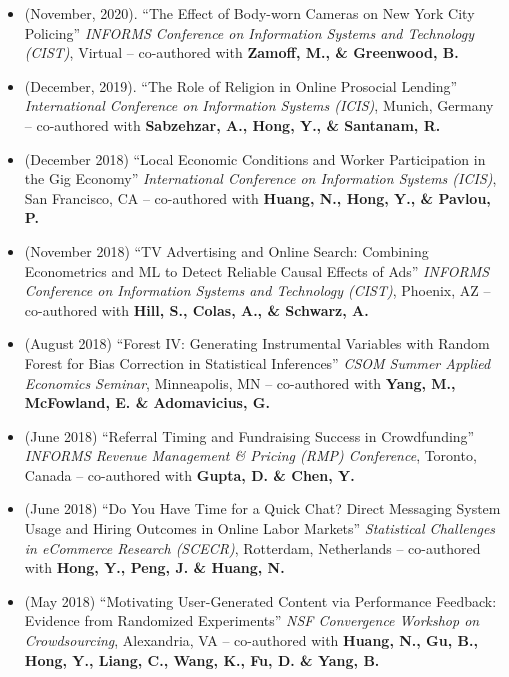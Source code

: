 \documentclass[10.5pt,letterpaper,sans]{moderncv}        %
\begin{document}
\begin{itemize}
\item (November, 2020). ``The Effect of Body-worn Cameras on New York City Policing'' \textit{INFORMS Conference on Information Systems and Technology (CIST)}, Virtual -- co-authored with \textbf{Zamoff, M., \& Greenwood, B.} 

\item (December, 2019). ``The Role of Religion in Online Prosocial Lending'' \textit{International Conference on Information Systems (ICIS)}, Munich, Germany -- co-authored with \textbf{Sabzehzar, A., Hong, Y., \& Santanam, R.} 

\item (December 2018) ``Local Economic Conditions and Worker Participation in the Gig Economy'' \textit{International Conference on Information Systems (ICIS)}, San Francisco, CA -- co-authored with \textbf{Huang, N., Hong, Y., \& Pavlou, P.} 

\item (November 2018) ``TV Advertising and Online Search: Combining Econometrics and ML to Detect Reliable Causal Effects of Ads'' \textit{INFORMS Conference on Information Systems and Technology (CIST)}, Phoenix, AZ -- co-authored with \textbf{Hill, S., Colas, A., \& Schwarz, A.}

\item (August 2018) ``Forest IV: Generating Instrumental Variables with Random Forest for Bias Correction in Statistical Inferences'' \textit{CSOM Summer Applied Economics Seminar}, Minneapolis, MN -- co-authored with \textbf{Yang, M., McFowland, E. \& Adomavicius, G.}

\item (June 2018) ``Referral Timing and Fundraising Success in Crowdfunding'' \textit{INFORMS Revenue Management \& Pricing (RMP) Conference}, Toronto, Canada -- co-authored with \textbf{Gupta, D. \& Chen, Y.}

\item (June 2018) ``Do You Have Time for a Quick Chat? Direct Messaging System Usage and Hiring Outcomes in Online Labor Markets'' \textit{Statistical Challenges in eCommerce Research (SCECR)}, Rotterdam, Netherlands -- co-authored with \textbf{Hong, Y., Peng, J. \& Huang, N.}

\item (May 2018) ``Motivating User-Generated Content via Performance Feedback: Evidence from Randomized Experiments'' \textit{NSF Convergence Workshop on Crowdsourcing}, Alexandria, VA -- co-authored with \textbf{Huang, N., Gu, B., Hong, Y., Liang, C., Wang, K., Fu, D. \& Yang, B.}


\end{itemize}
\end{document}
